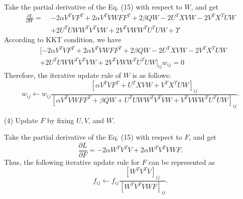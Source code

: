 \documentclass[a4paper,fleqn]{cas-sc}
\begin{document}
Take the partial derivative of the Eq. (15) with respect to $W$, and get
\begin{equation}
	\begin{aligned}
		\frac{\partial L}{\partial W} =\;& -2 \alpha V^T V F^T + 2 \alpha V^T V W F F^T + 2 \beta Q W - 2 U^T X V W - 2 V^T X^T U W\\
		&  + 2 U^T U W W^T V^T V W + 2 V^T V W W^T U^T U W + \Upsilon
	\end{aligned}
\end{equation}
According to KKT condition, we have
\begin{equation}
	\begin{aligned}
		&[ -2 \alpha V^T V F^T + 2 \alpha V^T V W F F^T + 2 \beta Q W 
		- 2 U^T X V W - 2 V^T X^T U W \\
		& + 2 U^T U W W^T V^T V W + 2 V^T V W W^T U^T U W ]_{ij} w_{ij} = 0
	\end{aligned}
\end{equation}
Therefore, the iterative update rule of $W$ is as follows:
\begin{equation}
	w_{i j} \leftarrow w_{i j} \frac{\left[\alpha V^T V F^T+U^T X V W +  V^T X^T U W\right]_{i j}}{\left[\alpha V^T V W F F^T+\beta Q W+U^T U W W^T V^T V W + V^T V W W^T U^T U W\right]_{i j}}.
\end{equation}

(4) Update $F$ by fixing $U, V$, and $W$.

Take the partial derivative of the Eq. (15) with respect to $F$, and get
\begin{equation}
	\frac{\partial L}{\partial F}=-2 \alpha W^T V^T V+2 \alpha W^T V^T V W F.
\end{equation}
Thus, the following iterative update rule for $F$ can be represented as
\begin{equation}
	f_{i j} \leftarrow f_{i j} \frac{\left[W^T V^T V\right]_{i j}}{\left[W^T V^T V W F\right]_{i j}}.
\end{equation}
\end{document}
